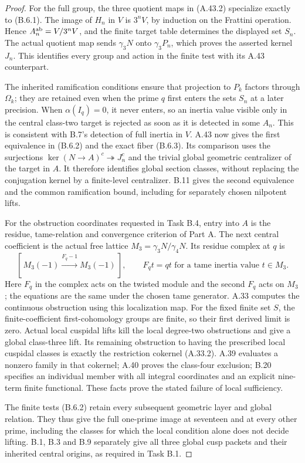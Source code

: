 \begin{proof}
For the full group, the three quotient maps in
(A.43.2) specialize exactly to (B.6.1). The image
of $H_n$ in $V$ is $3^nV$, by induction on the
Frattini operation. Hence
$A_n^{\rm ab}=V/3^nV$, and the finite target table
determines the displayed set $S_n$.
The actual quotient map sends $\gamma_3N$ onto
$\gamma_3P_n$, which proves the asserted kernel
$J_n$. This identifies every group and action
in the finite test with its A.43 counterpart.

The inherited ramification conditions ensure that
projection to $P_k$ factors through $\Omega_k$;
they are retained even when the prime $q$ first
enters the sets $S_n$ at a later precision.
When $\alpha(I_q)=0$, it never enters, so an
inertia value visible only in the central
class-two target is rejected as soon as it is
detected in some $A_n$. This is consistent with
B.7's detection of full inertia in $V$.
A.43 now gives the first equivalence in (B.6.2)
and the exact fiber (B.6.3). Its comparison
uses the surjections
$\ker(N\to A)^c\twoheadrightarrow J_n^c$
and the trivial global geometric centralizer
of the target in $A$. It therefore identifies
global section classes, without replacing the
conjugation kernel by a finite-level centralizer.
B.11 gives the second equivalence and the common
ramification bound, including for separately
chosen nilpotent lifts.

For the obstruction coordinates requested in
Task B.4, entry into $A$ is the residue,
tame-relation and convergence criterion of
Part A. The next central coefficient is the
actual free lattice
$M_3=\gamma_3N/\gamma_4N$. Its residue complex
at $q$ is
\[
 [\,M_3(-1)\xrightarrow{F_q-1}M_3(-1)\,],
 \qquad F_qt=qt
 \text{ for a tame inertia value }t\in M_3.                \tag{B.6.4}
\]
Here $F_q$ in the complex acts on the twisted
module and the second $F_q$ acts on $M_3$;
the equations are the same under the chosen
tame generator. A.33 computes the continuous
obstruction using this localization map. For
the fixed finite set $S$, the finite-coefficient
first-cohomology groups are finite, so their
first derived limit is zero. Actual local
cuspidal lifts kill the local degree-two
obstructions and give a global class-three
lift. Its remaining obstruction to having
the prescribed local cuspidal classes is
exactly the restriction cokernel (A.33.2).
A.39 evaluates a nonzero family in that
cokernel; A.40 proves the class-four exclusion;
B.20 specifies an individual member with all
integral coordinates and an explicit nine-term
finite functional. These facts prove the
stated failure of local sufficiency.

The finite tests (B.6.2) retain every subsequent
geometric layer and global relation. They thus
give the full one-prime image at seventeen
and at every other prime, including the
classes for which the local condition alone
does not decide lifting. B.1, B.3 and B.9
separately give all three global cusp packets
and their inherited central origins, as
required in Task B.1.
\end{proof}

